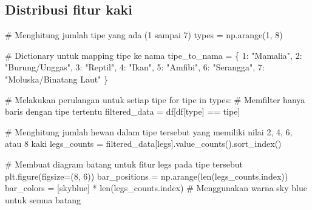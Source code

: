 \documentclass[
  letterpaper,
]{krantz}
\makeatletter
\newenvironment{Shaded}{\begin{snugshade}}{\end{snugshade}}
\newcommand{\BuiltInTok}[1]{\textcolor[rgb]{0.00,0.23,0.31}{#1}}
\newcommand{\CommentTok}[1]{\textcolor[rgb]{0.37,0.37,0.37}{#1}}
\newcommand{\ControlFlowTok}[1]{\textcolor[rgb]{0.00,0.23,0.31}{#1}}
\newcommand{\DecValTok}[1]{\textcolor[rgb]{0.68,0.00,0.00}{#1}}
\newcommand{\KeywordTok}[1]{\textcolor[rgb]{0.00,0.23,0.31}{#1}}
\newcommand{\NormalTok}[1]{\textcolor[rgb]{0.00,0.23,0.31}{#1}}
\newcommand{\OperatorTok}[1]{\textcolor[rgb]{0.37,0.37,0.37}{#1}}
\newcommand{\StringTok}[1]{\textcolor[rgb]{0.13,0.47,0.30}{#1}}
\newenvironment{kframe}{%
\medskip{}
\setlength{\fboxsep}{.8em}
 \def\at@end@of@kframe{}%
 \ifinner\ifhmode%
  \def\at@end@of@kframe{\end{minipage}}%
  \begin{minipage}{\columnwidth}%
 \fi\fi%
 \def\FrameCommand##1{\hskip\@totalleftmargin \hskip-\fboxsep
 \colorbox{shadecolor}{##1}\hskip-\fboxsep
     \hskip-\linewidth \hskip-\@totalleftmargin \hskip\columnwidth}%
 \MakeFramed {\advance\hsize-\width
   \@totalleftmargin\z@ \linewidth\hsize
   \@setminipage}}%
 {\par\unskip\endMakeFramed%
 \at@end@of@kframe}
\renewenvironment{Shaded}{\begin{kframe}}{\end{kframe}}
\makeatother
\begin{document}
\hypertarget{distribusi-fitur-kaki}{%
\subsection{Distribusi fitur kaki}\label{distribusi-fitur-kaki}}

\begin{Shaded}
\begin{Highlighting}[]

\CommentTok{\# Menghitung jumlah tipe yang ada (1 sampai 7)}
\NormalTok{types }\OperatorTok{=}\NormalTok{ np.arange(}\DecValTok{1}\NormalTok{, }\DecValTok{8}\NormalTok{)}

\CommentTok{\# Dictionary untuk mapping tipe ke nama}
\NormalTok{tipe\_to\_nama }\OperatorTok{=}\NormalTok{ \{}
    \DecValTok{1}\NormalTok{: }\StringTok{"Mamalia"}\NormalTok{,}
    \DecValTok{2}\NormalTok{: }\StringTok{"Burung/Unggas"}\NormalTok{,}
    \DecValTok{3}\NormalTok{: }\StringTok{"Reptil"}\NormalTok{,}
    \DecValTok{4}\NormalTok{: }\StringTok{"Ikan"}\NormalTok{,}
    \DecValTok{5}\NormalTok{: }\StringTok{"Amfibi"}\NormalTok{,}
    \DecValTok{6}\NormalTok{: }\StringTok{"Serangga"}\NormalTok{,}
    \DecValTok{7}\NormalTok{: }\StringTok{"Moluska/Binatang Laut"}
\NormalTok{\}}

\CommentTok{\# Melakukan perulangan untuk setiap tipe}
\ControlFlowTok{for}\NormalTok{ tipe }\KeywordTok{in}\NormalTok{ types:}
    \CommentTok{\# Memfilter hanya baris dengan tipe tertentu}
\NormalTok{    filtered\_data }\OperatorTok{=}\NormalTok{ df[df[}\StringTok{\textquotesingle{}type\textquotesingle{}}\NormalTok{] }\OperatorTok{==}\NormalTok{ tipe]}

    \CommentTok{\# Menghitung jumlah hewan dalam tipe tersebut yang memiliki nilai 2, 4, 6, atau 8 kaki}
\NormalTok{    legs\_counts }\OperatorTok{=}\NormalTok{ filtered\_data[}\StringTok{\textquotesingle{}legs\textquotesingle{}}\NormalTok{].value\_counts().sort\_index()}

    \CommentTok{\# Membuat diagram batang untuk fitur \textquotesingle{}legs\textquotesingle{} pada tipe tersebut}
\NormalTok{    plt.figure(figsize}\OperatorTok{=}\NormalTok{(}\DecValTok{8}\NormalTok{, }\DecValTok{6}\NormalTok{))}
\NormalTok{    bar\_positions }\OperatorTok{=}\NormalTok{ np.arange(}\BuiltInTok{len}\NormalTok{(legs\_counts.index))}
\NormalTok{    bar\_colors }\OperatorTok{=}\NormalTok{ [}\StringTok{\textquotesingle{}skyblue\textquotesingle{}}\NormalTok{] }\OperatorTok{*} \BuiltInTok{len}\NormalTok{(legs\_counts.index)  }\CommentTok{\# Menggunakan warna sky blue untuk semua batang}


\end{Highlighting}
\end{Shaded}
\end{document}
